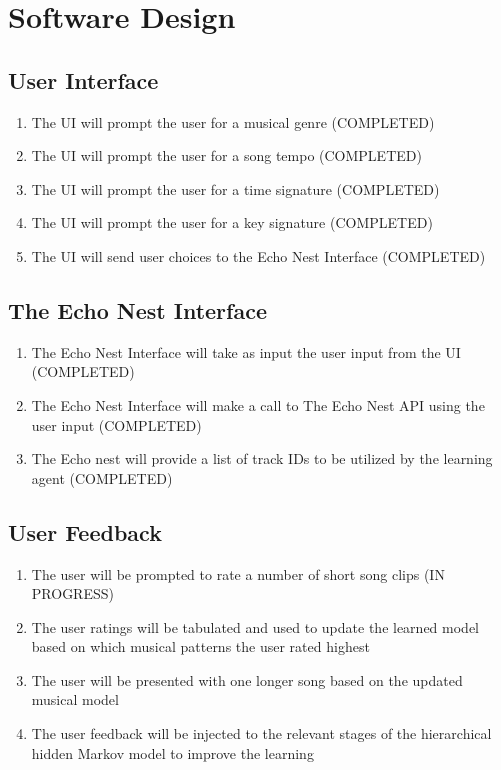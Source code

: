 \documentclass{article}
\begin{document}
\section{Software Design}
\subsection{User Interface}
\begin{enumerate}
\item The UI will prompt the user for a musical genre (COMPLETED)
\item The UI will prompt the user for a song tempo (COMPLETED)
\item The UI will prompt the user for a time signature (COMPLETED)
\item The UI will prompt the user for a key signature (COMPLETED)
\item The UI will send user choices to the Echo Nest Interface (COMPLETED)
\end{enumerate}

\subsection{The Echo Nest Interface}
\begin{enumerate}
\item The Echo Nest Interface will take as input the user input from the UI (COMPLETED)
\item The Echo Nest Interface will make a call to The Echo Nest API using the user input (COMPLETED)
\item The Echo nest will provide a list of track IDs to be utilized by the learning agent (COMPLETED)
\end{enumerate}

\subsection{User Feedback}
\begin{enumerate}
\item The user will be prompted to rate a number of short song clips (IN PROGRESS)
\item The user ratings will be tabulated and used to update the learned model based on which musical patterns the user rated highest
\item The user will be presented with one longer song based on the updated musical model
\item The user feedback will be injected to the relevant stages of the hierarchical hidden Markov model to improve the learning
\end{enumerate}
\end{document}
